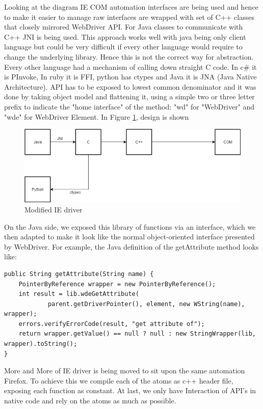 \documentclass[article,type=msc,colorback,accentcolor=tud9c,twoside,11pt]{tudthesis}
\begin{document}
Looking at the diagram IE COM automation interfaces are being used and hence to make it easier to manage raw interfaces are wrapped with set of C++ classes that closely mirrored WebDriver API. For Java classes to communicate with C++ JNI is being used. This approach works well with java being only client language but could be very difficult if every other language would require to change the underlying library. Hence this is not the correct way for abstraction. Every other language had a mechanism of calling down straight C code. In c\# it is PInvoke, In ruby it is FFI, python has ctypes and Java it is JNA (Java Native Architecture). API has to be exposed to lowest common denominator and it was done by taking object model and flattening it, using a simple two or three letter prefix to indicate the "home interface" of the method: "wd" for "WebDriver" and "wde" for WebDriver Element. In Figure 
\ref{fig:ModifiedIEdriver}, design is shown 
\begin{figure}[h]
	\centering
	\includegraphics[scale=0.6]{ModifiedIEdriver.PNG}
	\caption{Modified IE driver}
	\label{fig:ModifiedIEdriver}
\end{figure}
On the Java side, we exposed this library of functions via an interface, which we then adapted to make it look like the normal object-oriented interface presented by WebDriver. For example, the Java definition of the getAttribute method looks like:

\begin{lstlisting}
public String getAttribute(String name) {
	PointerByReference wrapper = new PointerByReference();
	int result = lib.wdeGetAttribute(
			parent.getDriverPointer(), element, new WString(name), wrapper);
	errors.verifyErrorCode(result, "get attribute of");
	return wrapper.getValue() == null ? null : new StringWrapper(lib, wrapper).toString();
}
\end{lstlisting}

More and More of IE driver is being moved to sit upon the same automation Firefox. To achieve this we compile each of the atoms as c++ header file, exposing each function as constant. At last, we only have Interaction of API's in native code and rely on the atoms as much as possible.
\end{document}
